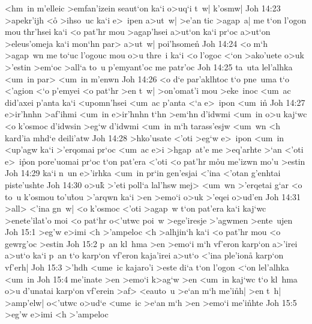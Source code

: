 <hm~in
m'elleic
>emfan'izein
seaut`on
ka`i
o>uq`i
t~w|
k'osmw|\bibvsend
\vs Joh 14:23
>apekr'ijh
<o\r{}
>ihso~uc
ka`i
e>~ipen
a>ut~w|
>e'an
tic
>agap~a|
me
t`on
l'ogon
mou
thr'hsei
ka`i
<o
pat'hr
mou
>agap'hsei
a>ut`on
ka`i
pr`oc
a>ut`on
>eleus'omeja
ka`i
mon`hn
par>
a>ut~w|
poi'hsome\r{n}\bibvsend
{}
\vs Joh 14:24
<o
m`h
>agap~wn
me
to`uc
l'ogouc
mou
o>u
thre~i
ka`i
<o
l'ogoc
<`on
>ako'uete
o>uk
>'estin
>em`oc
>all`a
to~u
p'emyant'oc
me
patr'oc\bibvsend
\vs Joh 14:25
ta~uta
lel'alhka
<um~in
par>
<um~in
m'enwn\bibvsend
\vs Joh 14:26
<o
d`e
par'aklhtoc
t`o
pne~uma
t`o
<'agion
<`o
p'emyei
<o
pat`hr
>en
t~w|
>on'omat'i
mou
>eke~inoc
<um~ac
did'axei
p'anta
ka`i
<upomn'hsei
<um~ac
p'anta
<`a
e>~ipon
<um~i\r{n}\bibvsend
{}
\vs Joh 14:27
e>ir'hnhn
>af'ihmi
<um~in
e>ir'hnhn
t`hn
>em`hn
d'idwmi
<um~in
o>u
kaj`wc
<o
k'osmoc
d'idwsin
>eg`w
d'idwmi
<um~in
m`h
tarass'esjw
<um~wn
<h
kard'ia
mhd`e
deili'atw\bibvsend
\vs Joh 14:28
>hko'usate
<'oti
>eg`w
e>~ipon
<um~in
<up'agw
ka`i
>'erqomai
pr`oc
<um~ac
e>i
>hgap~at'e
me
>eq'arhte
>`an
<'oti
e>~i\r{p}on
pore'uomai
pr`oc
t`on
pat'era
<'oti
<o
pat'hr
m\r{o}u
me'izwn
mo'u
>estin\bibvsend
\vs Joh 14:29
ka`i
n~un
e>'irhka
<um~in
pr`in
gen'esjai
<'ina
<'otan
g'enhtai
piste'ushte\bibvsend
\vs Joh 14:30
o>uk\r{}
>'eti
poll`a
lal'hsw
mej>
<um~wn
>'erqetai
g`ar
<o
to~u
k'osmou
to'u\r{t}ou
>'arqwn
ka`i
>en
>emo`i
o>uk
>'eqei
o>ud'en\bibvsend
\vs Joh 14:31
>all>
<'ina
gn~w|
<o
k'osmoc
<'oti
>agap~w
t`on
pat'era
ka`i
kaj`wc
>enete'ilat'o
moi
<o
pat`hr
o<'utwc
poi~w
>ege'iresje
>'agwmen
>ente~ujen\bibvsend
\vs Joh 15:1
>eg'w
e>imi
<h
>'ampeloc
<h
>alhjin`h
ka`i
<o
pat'hr
mou
<o
gewrg'oc
>estin\bibvsend
\vs Joh 15:2
p~an
kl~hma
>en
>emo`i
m`h
vf'eron
karp`on
a>'irei
a>ut`o
ka`i
p~an
t`o
karp`on
vf'eron
kaja'irei
a>ut`o
<'ina
ple'iona\r{}
karp`on
vf'erh|\bibvsend
\vs Joh 15:3
>'hdh
<ume~ic
kajaro'i
>este
di`a
t`on
l'ogon
<`on
lel'alhka
<um~in\bibvsend
\vs Joh 15:4
me'inate
>en
>emo`i
k>ag`w
>en
<um~in
kaj`wc
t`o
kl~hma
o>u
d'unatai
karp`on
vf'erein
>af>
<eauto~u
>e`an
m`h
me'i\r{n}h|
>en
t~h|
>amp'elw|
o<'utwc
o>ud`e
<ume~ic
>e`an
m`h
>en
>emo`i
me'i\r{n}hte\bibvsend
{}
\vs Joh 15:5
>eg'w
e>imi
<h
>'ampeloc
